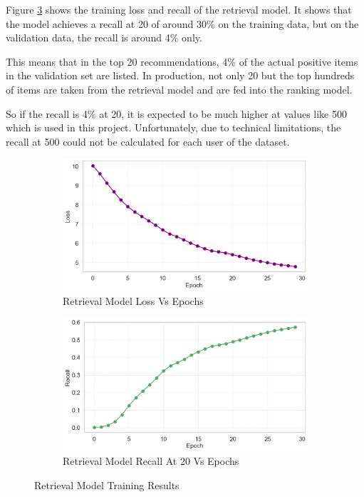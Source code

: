 Figure \ref{fig: RetrievalModelTraining} shows the training loss and recall of the retrieval model.
It shows that the model achieves a recall at 20 of around 30\% on the training data, but on the validation data, the recall is around 4\% only.

This means that in the top 20 recommendations, 4\% of the actual positive items in the validation set are listed.
In production, not only 20 but the top hundreds of items are taken from the retrieval model and are fed into the ranking model. 

So if the recall is 4\% at 20, it is expected to be much higher at values like 500 which is used in this project.
Unfortunately, due to technical limitations, the recall at 500 could not be calculated for each user of the dataset.

\begin{figure}[H]
    \centering
    \begin{subfigure}{\textwidth}
        \centering
        \includegraphics[width=\textwidth]{assets/retrieval_trianing_loss.png}
        \caption[Retrieval Model Loss]{Retrieval Model Loss Vs Epochs}
        \label{fig:RetrievalModelLoss}
    \end{subfigure}
    \bigskip
    \begin{subfigure}{\textwidth}
        \centering
        \includegraphics[width=\textwidth]{assets/retrieval_trianing_recall.png}
        \caption[Retrieval Model Recall]{Retrieval Model Recall At 20 Vs Epochs}
        \label{fig:RetrievalModelRecall}
    \end{subfigure}
    \caption[Retrieval Model Training]{Retrieval Model Training Results}
    \label{fig: RetrievalModelTraining}
\end{figure}

